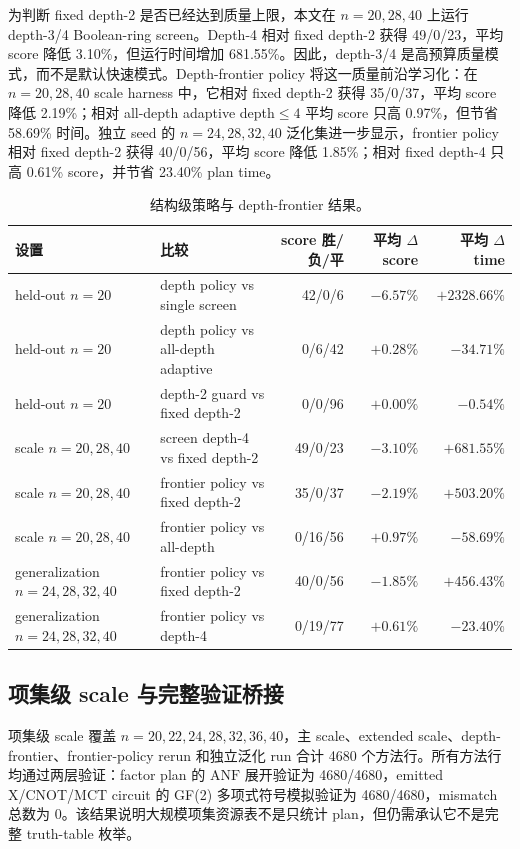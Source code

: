 \documentclass[UTF8,fontset=macnew,11pt]{ctexart}
\newcommand{\screen}{Boolean-ring screen}
\newcommand{\anf}{\ensuremath{\mathrm{ANF}}}
\newcommand{\ttable}{truth-table}
\newcommand{\mct}{\ensuremath{\mathrm{MCT}}}
\begin{document}
为判断 fixed depth-2 是否已经达到质量上限，本文在 $n=20,28,40$ 上运行 depth-3/4 \screen{}。Depth-4 相对 fixed depth-2 获得 49/0/23，平均 score 降低 3.10\%，但运行时间增加 681.55\%。因此，depth-3/4 是高预算质量模式，而不是默认快速模式。Depth-frontier policy 将这一质量前沿学习化：在 $n=20,28,40$ scale harness 中，它相对 fixed depth-2 获得 35/0/37，平均 score 降低 2.19\%；相对 all-depth adaptive depth$\leq4$ 平均 score 只高 0.97\%，但节省 58.69\% 时间。独立 seed 的 $n=24,28,32,40$ 泛化集进一步显示，frontier policy 相对 fixed depth-2 获得 40/0/56，平均 score 降低 1.85\%；相对 fixed depth-4 只高 0.61\% score，并节省 23.40\% plan time。

\begin{table}[H]
\centering
\scriptsize
\caption{结构级策略与 depth-frontier 结果。}
\label{tab:policy}
\begin{tabular}{llrrr}
\toprule
设置 & 比较 & score 胜/负/平 & 平均 $\Delta$ score & 平均 $\Delta$ time \\
\midrule
held-out $n=20$ & depth policy vs single screen & 42/0/6 & $-6.57\%$ & $+2328.66\%$ \\
held-out $n=20$ & depth policy vs all-depth adaptive & 0/6/42 & $+0.28\%$ & $-34.71\%$ \\
held-out $n=20$ & depth-2 guard vs fixed depth-2 & 0/0/96 & $+0.00\%$ & $-0.54\%$ \\
scale $n=20,28,40$ & screen depth-4 vs fixed depth-2 & 49/0/23 & $-3.10\%$ & $+681.55\%$ \\
scale $n=20,28,40$ & frontier policy vs fixed depth-2 & 35/0/37 & $-2.19\%$ & $+503.20\%$ \\
scale $n=20,28,40$ & frontier policy vs all-depth & 0/16/56 & $+0.97\%$ & $-58.69\%$ \\
generalization $n=24,28,32,40$ & frontier policy vs fixed depth-2 & 40/0/56 & $-1.85\%$ & $+456.43\%$ \\
generalization $n=24,28,32,40$ & frontier policy vs depth-4 & 0/19/77 & $+0.61\%$ & $-23.40\%$ \\
\bottomrule
\end{tabular}
\end{table}

\subsection{项集级 scale 与完整验证桥接}

项集级 scale 覆盖 $n=20,22,24,28,32,36,40$，主 scale、extended scale、depth-frontier、frontier-policy rerun 和独立泛化 run 合计 4680 个方法行。所有方法行均通过两层验证：factor plan 的 \anf{} 展开验证为 4680/4680，emitted X/CNOT/\mct{} circuit 的 GF(2) 多项式符号模拟验证为 4680/4680，mismatch 总数为 0。该结果说明大规模项集资源表不是只统计 plan，但仍需承认它不是完整 \ttable{} 枚举。
\end{document}
